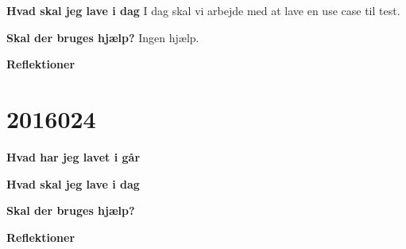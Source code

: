 \documentclass{article}
\begin{document}
	\textbf{Hvad skal jeg lave i dag}
	\subitem I dag skal vi arbejde med at lave en use case til test. 	 
	
	\textbf{Skal der bruges hjælp?}
	\subitem Ingen hjælp. 
	
	\textbf{Reflektioner}
	
	\section{2016024}
	
	\textbf{Hvad har jeg lavet i går}
	
	
	\textbf{Hvad skal jeg lave i dag}
	
	
	\textbf{Skal der bruges hjælp?}
	
	
	\textbf{Reflektioner}
\end{document}

